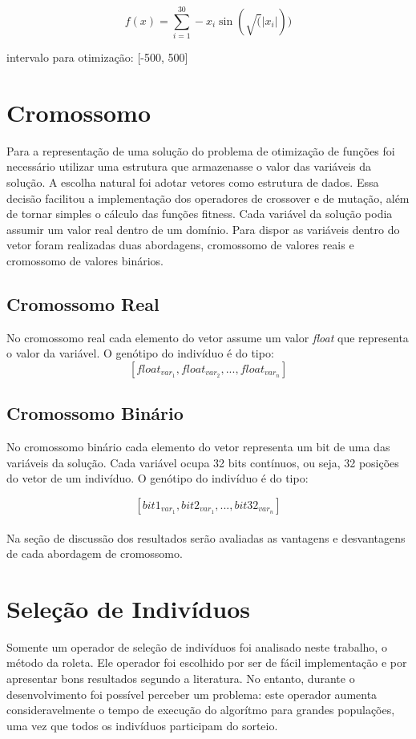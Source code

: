 \documentclass[conference]{IEEEtran}
\begin{document}
\[f(x) = \sum_{i=1}^{30} -x_i \sin(\sqrt(\left|x_i\right|))\]
\begin{center}intervalo para otimização: [-500, 500]\\\end{center}


\section{Cromossomo}
Para a representação de uma solução do problema de otimização de funções foi
necessário utilizar uma estrutura que armazenasse o valor das variáveis da
solução. A escolha natural foi adotar vetores como estrutura de dados. Essa
decisão facilitou a implementação dos operadores de crossover e de mutação, além
de tornar simples o cálculo das funções fitness.
Cada variável da solução podia assumir um valor real dentro de um domínio. Para
dispor as variáveis dentro do vetor foram realizadas duas abordagens, cromossomo
de valores reais e cromossomo de valores binários.\\

\subsection{Cromossomo Real}
No cromossomo real cada elemento do vetor assume um valor \textit{float} que
representa o valor da variável. O genótipo do indivíduo é do tipo:
\[[float_{var_1}, float_{var_2}, ..., float_{var_n}]\]

\subsection{Cromossomo Binário}
No cromossomo binário cada elemento do vetor representa um bit de uma das 
variáveis da solução. Cada variável ocupa 32 bits contínuos, ou seja, 32 
posições do vetor de um indivíduo. O genótipo do indivíduo é do tipo:

\[[bit1_{var_1}, bit2_{var_1}, ..., bit32_{var_n}]\]\\

Na seção de discussão dos resultados serão avaliadas as vantagens e desvantagens
de cada abordagem de cromossomo.

\section{Seleção de Indivíduos}
Somente um operador de seleção de indivíduos foi analisado neste trabalho, o
método da roleta. Ele operador foi escolhido por ser de fácil implementação e
por apresentar bons resultados segundo a literatura. No entanto, durante o
desenvolvimento foi possível perceber um problema: este operador aumenta
consideravelmente o tempo de execução do algorítmo para grandes populações, uma 
vez que todos os indivíduos participam do sorteio.
\end{document}
